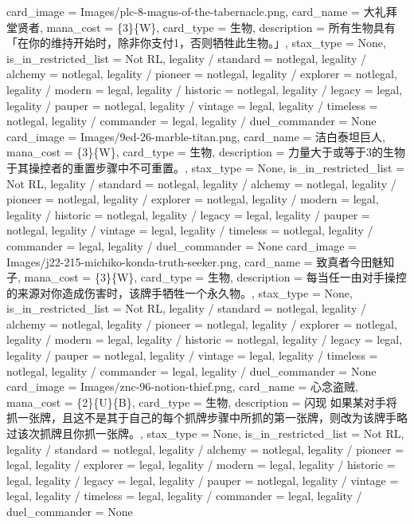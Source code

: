 \documentclass[lang = cn, color = black, 10pt]{AllThatStax}
\begin{document}
\card
{
	card_image = Images/plc-8-magus-of-the-tabernacle.png,
	card_name = 大礼拜堂贤者,
	mana_cost = \{3\}\{W\},
	card_type = 生物,
	description = 所有生物具有「在你的维持开始时，除非你支付{1}，否则牺牲此生物。」,
	stax_type = None,
	is_in_restricted_list = Not RL,
	legality / standard = notlegal,
	legality / alchemy = notlegal,
	legality / pioneer = notlegal,
	legality / explorer = notlegal,
	legality / modern = legal,
	legality / historic = notlegal,
	legality / legacy = legal,
	legality / pauper = notlegal,
	legality / vintage = legal,
	legality / timeless = notlegal,
	legality / commander = legal,
	legality / duel_commander = None
}
\card
{
	card_image = Images/9ed-26-marble-titan.png,
	card_name = 洁白泰坦巨人,
	mana_cost = \{3\}\{W\},
	card_type = 生物,
	description = 力量大于或等于3的生物于其操控者的重置步骤中不可重置。,
	stax_type = None,
	is_in_restricted_list = Not RL,
	legality / standard = notlegal,
	legality / alchemy = notlegal,
	legality / pioneer = notlegal,
	legality / explorer = notlegal,
	legality / modern = legal,
	legality / historic = notlegal,
	legality / legacy = legal,
	legality / pauper = notlegal,
	legality / vintage = legal,
	legality / timeless = notlegal,
	legality / commander = legal,
	legality / duel_commander = None
}
\card
{
	card_image = Images/j22-215-michiko-konda-truth-seeker.png,
	card_name = 致真者今田魅知子,
	mana_cost = \{3\}\{W\},
	card_type = 生物,
	description = 每当任一由对手操控的来源对你造成伤害时，该牌手牺牲一个永久物。,
	stax_type = None,
	is_in_restricted_list = Not RL,
	legality / standard = notlegal,
	legality / alchemy = notlegal,
	legality / pioneer = notlegal,
	legality / explorer = notlegal,
	legality / modern = legal,
	legality / historic = notlegal,
	legality / legacy = legal,
	legality / pauper = notlegal,
	legality / vintage = legal,
	legality / timeless = notlegal,
	legality / commander = legal,
	legality / duel_commander = None
}
\card
{
	card_image = Images/znc-96-notion-thief.png,
	card_name = 心念盗贼,
	mana_cost = \{2\}\{U\}\{B\},
	card_type = 生物,
	description = 闪现
	如果某对手将抓一张牌，且这不是其于自己的每个抓牌步骤中所抓的第一张牌，则改为该牌手略过该次抓牌且你抓一张牌。,
	stax_type = None,
	is_in_restricted_list = Not RL,
	legality / standard = notlegal,
	legality / alchemy = notlegal,
	legality / pioneer = legal,
	legality / explorer = legal,
	legality / modern = legal,
	legality / historic = legal,
	legality / legacy = legal,
	legality / pauper = notlegal,
	legality / vintage = legal,
	legality / timeless = legal,
	legality / commander = legal,
	legality / duel_commander = None
}
\end{document}
